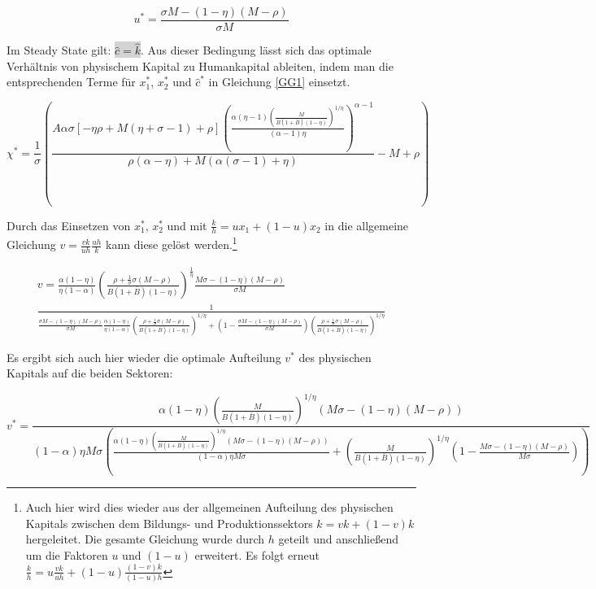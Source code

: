 	\begin{equation}
		\boxed{u^*=\frac{\sigma M-(1-\eta)(M-\rho)}{\sigma M}}
	\end{equation}


Im Steady State gilt: \colorbox{lightgray}{$\hat{c}=\hat{k}$}. Aus dieser Bedingung lässt sich das optimale Verhältnis von physischem Kapital zu Humankapital ableiten, indem man die entsprechenden Terme für $x_1^*$, $x_2^*$ und $\hat{c}^*$  in Gleichung \eqref{GG1} einsetzt. 


	\begin{equation}
		\boxed{\chi^*=\frac{1}{\sigma}\left(\frac{A\alpha \sigma[-\eta\rho+M(\eta+\sigma-1)+\rho] \left(\frac{\alpha  (\eta -1) \left(\frac{M}{B (1+\bar{B})(1-\eta) }\right)^{1/\eta }}{(\alpha -1) \eta }\right)^{\alpha -1}}{\rho  (\alpha -\eta )+M (\alpha  (\sigma -1)+\eta )}-M+\rho\right)}
	\end{equation}


Durch das Einsetzen von $x_1^*$, $x_2^*$ und mit $\frac{k}{h}=u x_1+(1-u)x_2$ in die allgemeine Gleichung $v=\frac{vk}{uh}\frac{uh}{k}$ kann diese gelöst werden.\footnote{Auch hier wird dies wieder aus der allgemeinen Aufteilung des physischen Kapitals zwischen dem Bildungs- und Produktionssektors $k=vk+(1-v)k$ hergeleitet. Die gesamte Gleichung wurde durch $h$ geteilt und anschlie{\ss}end um die Faktoren $u$ und $(1-u)$ erweitert. Es folgt erneut $\frac{k}{h}=u\frac{vk}{uh}+(1-u)\frac{(1-v)k}{(1-u)h}$}


	\begin{equation}
		\begin{split}
			v=\frac{\alpha(1-\eta)}{\eta(1-\alpha)} \left(\frac{\rho+\frac{1}{\sigma} \sigma(M-\rho)}{B (1+\bar{B}) (1-\eta )}\right)^{\frac{1}{\eta}} \frac{M \sigma -(1-\eta ) (M-\rho )}{ \sigma M}\\
			\frac{1}{\frac{ \sigma M -(1-\eta ) (M-\rho )}{\sigma M }\frac{\alpha(1-\eta)}{\eta(1-\alpha)}\left(\frac{\rho+\frac{1}{\sigma}\sigma(M-\rho )}{B (1+\bar{B}) (1-\eta )}\right)^{1/\eta }+\left(1-\frac{ \sigma M-(1-\eta ) (M-\rho )}{ \sigma M}\right) \left(\frac{\rho+\frac{1}{\sigma}\sigma(M-\rho )}{B (1+\bar{B}) (1-\eta )}\right)^{1/\eta }}
		\end{split}
	\end{equation}


Es ergibt sich auch hier wieder die optimale Aufteilung $v^*$ des physischen Kapitals auf die beiden Sektoren:


	\begin{equation}
		\boxed{
		v^*=\frac{\alpha  (1-\eta ) \left(\frac{M}{B (1+\bar{B}) (1-\eta )}\right)^{1/\eta } (M \sigma -(1-\eta ) (M-\rho ))}{(1-\alpha ) \eta  M \sigma  \left(\frac{\alpha  (1-\eta ) \left(\frac{M}{B (1+\bar{B}) (1-\eta )}\right)^{1/\eta } (M \sigma -(1-\eta ) (M-\rho ))}{(1-\alpha ) \eta  M \sigma }+\left(\frac{M}{B (1+\bar{B}) (1-\eta )}\right)^{1/\eta } \left(1-\frac{M \sigma -(1-\eta ) (M-\rho )}{M \sigma }\right)\right)}}
	\end{equation}